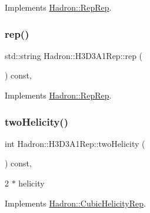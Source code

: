 Implements \mbox{\hyperlink{structHadron_1_1RepRep_ab3213025f6de249f7095892109575fde}{Hadron\+::\+Rep\+Rep}}.

\mbox{\label{structHadron_1_1H3D3A1Rep_a79c066008e353585d55f726285ae56cd}} 
\subsubsection{\texorpdfstring{rep()}{rep()}\hspace{0.1cm}{\footnotesize\ttfamily [5/5]}}
{\footnotesize\ttfamily std\+::string Hadron\+::\+H3\+D3\+A1\+Rep\+::rep (\begin{DoxyParamCaption}{ }\end{DoxyParamCaption}) const\hspace{0.3cm}{\ttfamily [inline]}, {\ttfamily [virtual]}}



Implements \mbox{\hyperlink{structHadron_1_1RepRep_ab3213025f6de249f7095892109575fde}{Hadron\+::\+Rep\+Rep}}.

\mbox{\label{structHadron_1_1H3D3A1Rep_a6224faf1aafe58abef4151638b0ccacb}} 
\subsubsection{\texorpdfstring{twoHelicity()}{twoHelicity()}\hspace{0.1cm}{\footnotesize\ttfamily [1/3]}}
{\footnotesize\ttfamily int Hadron\+::\+H3\+D3\+A1\+Rep\+::two\+Helicity (\begin{DoxyParamCaption}{ }\end{DoxyParamCaption}) const\hspace{0.3cm}{\ttfamily [inline]}, {\ttfamily [virtual]}}

2 $\ast$ helicity 

Implements \mbox{\hyperlink{structHadron_1_1CubicHelicityRep_af507aa56fc2747eacc8cb6c96db31ecc}{Hadron\+::\+Cubic\+Helicity\+Rep}}.

\mbox{\label{structHadron_1_1H3D3A1Rep_a6224faf1aafe58abef4151638b0ccacb}} 

